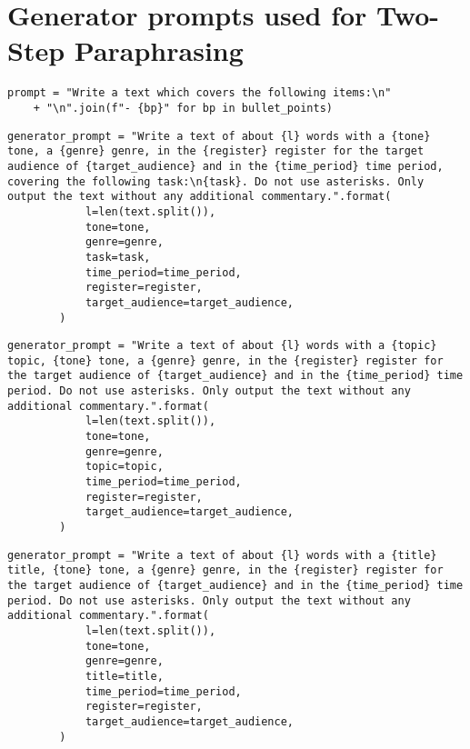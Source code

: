 \section{Generator prompts used for Two-Step Paraphrasing}
\label{app:generator_prompts}
\begin{verbatim}
prompt = "Write a text which covers the following items:\n" 
    + "\n".join(f"- {bp}" for bp in bullet_points)
\end{verbatim}

\begin{verbatim}
generator_prompt = "Write a text of about {l} words with a {tone} tone, a {genre} genre, in the {register} register for the target audience of {target_audience} and in the {time_period} time period, covering the following task:\n{task}. Do not use asterisks. Only output the text without any additional commentary.".format(
            l=len(text.split()),
            tone=tone,
            genre=genre,
            task=task,
            time_period=time_period,
            register=register,
            target_audience=target_audience,
        )
\end{verbatim}

\begin{verbatim}
generator_prompt = "Write a text of about {l} words with a {topic} topic, {tone} tone, a {genre} genre, in the {register} register for the target audience of {target_audience} and in the {time_period} time period. Do not use asterisks. Only output the text without any additional commentary.".format(
            l=len(text.split()),
            tone=tone,
            genre=genre,
            topic=topic,
            time_period=time_period,
            register=register,
            target_audience=target_audience,
        )
\end{verbatim}

\begin{verbatim}
generator_prompt = "Write a text of about {l} words with a {title} title, {tone} tone, a {genre} genre, in the {register} register for the target audience of {target_audience} and in the {time_period} time period. Do not use asterisks. Only output the text without any additional commentary.".format(
            l=len(text.split()),
            tone=tone,
            genre=genre,
            title=title,
            time_period=time_period,
            register=register,
            target_audience=target_audience,
        )
\end{verbatim}